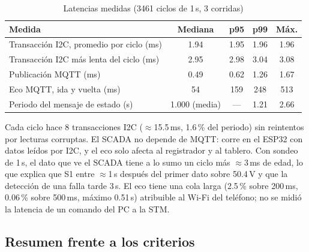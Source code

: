 \documentclass[conference]{IEEEtran}
\begin{document}
\begin{table}[!t]
\caption{Latencias medidas (3461 ciclos de 1\,s, 3 corridas)}
\label{tab:lat}
\centering
\scriptsize\setlength{\tabcolsep}{3pt}
\begin{tabular}{|l|c|c|c|c|}
\hline
\textbf{Medida} & \textbf{Mediana} & \textbf{p95} & \textbf{p99} & \textbf{Máx.} \\ \hline
Transacción I2C, promedio por ciclo (ms) & 1.94 & 1.95 & 1.96 & 1.96 \\ \hline
Transacción I2C más lenta del ciclo (ms) & 2.95 & 2.98 & 3.04 & 3.08 \\ \hline
Publicación MQTT (ms) & 0.49 & 0.62 & 1.26 & 1.67 \\ \hline
Eco MQTT, ida y vuelta (ms) & 54 & 159 & 248 & 513 \\ \hline
Periodo del mensaje de estado (s) & 1.000 (media) & --- & 1.21 & 2.66 \\ \hline
\end{tabular}
\end{table}

Cada ciclo hace 8 transacciones I2C ($\approx$15.5\,ms, 1.6\,\% del periodo) sin reintentos por lecturas corruptas. El SCADA no depende de MQTT: corre en el ESP32 con datos leídos por I2C, y el eco solo afecta al registrador y al tablero. Con sondeo de 1\,s, el dato que ve el SCADA tiene a lo sumo un ciclo más $\approx$3\,ms de edad, lo que explica que S1 entre $\approx$1\,s después del primer dato sobre 50.4\,V y que la detección de una falla tarde 3\,s. El eco tiene una cola larga (2.5\,\% sobre 200\,ms, 0.06\,\% sobre 500\,ms, máximo 0.51\,s) atribuible al Wi-Fi del teléfono; no se midió la latencia de un comando del PC a la STM.

\subsection{Resumen frente a los criterios}
\label{sec:resumen}
\end{document}
